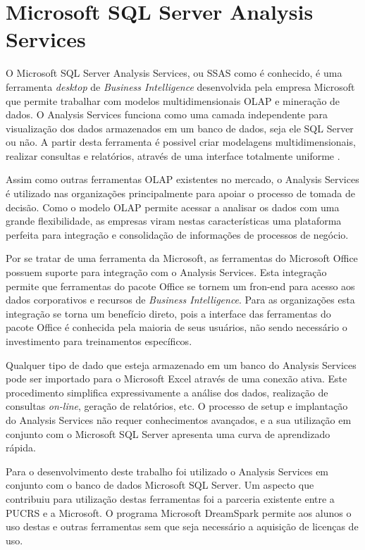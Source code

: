 \section{Microsoft SQL Server Analysis Services}
O Microsoft SQL Server Analysis Services, ou SSAS como é conhecido, é uma ferramenta \emph{desktop} de \emph{Business Intelligence} desenvolvida pela empresa Microsoft que permite trabalhar com modelos multidimensionais OLAP e mineração de dados. O Analysis Services funciona como uma camada independente para visualização dos dados armazenados em um banco de dados, seja ele SQL Server ou não. A partir desta ferramenta é possivel criar modelagens multidimensionais, realizar consultas e relatórios, através de uma interface totalmente uniforme \cite{MIC13}.

Assim como outras ferramentas OLAP existentes no mercado, o Analysis Services é utilizado nas organizações principalmente para apoiar o processo de tomada de decisão. Como o modelo OLAP permite acessar a analisar os dados com uma grande flexibilidade, as empresas viram nestas características uma plataforma perfeita para integração e consolidação de informações de processos de negócio.

Por se tratar de uma ferramenta da Microsoft, as ferramentas do Microsoft Office possuem suporte para integração com o Analysis Services. Esta integração permite que ferramentas do pacote Office se tornem um fron-end para acesso aos dados corporativos e recursos de \emph{Business Intelligence}. Para as organizações esta integração se torna um benefício direto, pois a interface das ferramentas do pacote Office é conhecida pela maioria de seus usuários, não sendo necessário o investimento para treinamentos específicos.

Qualquer tipo de dado que esteja armazenado em um banco do Analysis Services pode ser importado para o Microsoft Excel através de uma conexão ativa. Este procedimento simplifica expressivamente a análise dos dados, realização de consultas \emph{on-line}, geração de relatórios, etc. O processo de setup e implantação do Analysis Services não requer conhecimentos avançados, e a sua utilização em conjunto com o Microsoft SQL Server apresenta uma curva de aprendizado rápida.

Para o desenvolvimento deste trabalho foi utilizado o Analysis Services em conjunto com o banco de dados Microsoft SQL Server. Um aspecto que contribuiu para utilização destas ferramentas foi a parceria existente entre a PUCRS e a Microsoft. O programa Microsoft DreamSpark permite aos alunos o uso destas e outras ferramentas sem que seja necessário a aquisição de licenças de uso.

